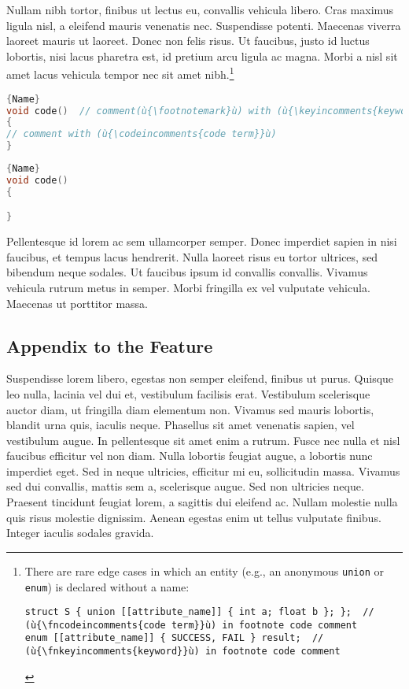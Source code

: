 Nullam nibh tortor, finibus ut lectus eu, convallis vehicula libero. Cras maximus ligula nisl, a eleifend mauris venenatis nec. Suspendisse potenti. Maecenas viverra laoreet mauris ut laoreet. Donec non felis risus. Ut faucibus, justo id luctus lobortis, nisi lacus pharetra est, id pretium arcu ligula ac magna. Morbi a nisl sit amet lacus vehicula tempor nec sit amet nibh.{\cprotect\footnote{There are rare edge cases in which an
entity (e.g., an anonymous \texttt{union} or \texttt{enum}) is
declared without a name:
\begin{lstlisting}[style=footcode,]
struct S { union [[attribute_name]] { int a; float b }; };  // (ù{\fncodeincomments{code term}}ù) in footnote code comment
enum [[attribute_name]] { SUCCESS, FAIL } result;  //  (ù{\fnkeyincomments{keyword}}ù) in footnote code comment
\end{lstlisting} \vspace*{-1ex}
      }}


\noindent\begin{minipage}{.45\textwidth}
\begin{lstlisting}[language=C++, caption=code 1 with a long and wrapping title,frame=tb]{Name}
void code()  // comment(ù{\footnotemark}ù) with (ù{\keyincomments{keyword}}ù)
{
// comment with (ù{\codeincomments{code term}}ù)
}
\end{lstlisting}
\end{minipage}\hfill
\begin{minipage}{.45\textwidth}
\begin{lstlisting}[language=C++, caption=code 2 with a long and wrapping title,frame=tb]{Name}
void code()
{

}
\end{lstlisting}
\end{minipage}

Pellentesque id lorem ac sem ullamcorper semper. Donec imperdiet sapien in nisi faucibus, et tempus lacus hendrerit. Nulla laoreet risus eu tortor ultrices, sed bibendum neque sodales. Ut faucibus ipsum id convallis convallis. Vivamus vehicula rutrum metus in semper. Morbi fringilla ex vel vulputate vehicula. Maecenas ut porttitor massa.

\subsection[Appendix to the Feature]{Appendix to the Feature}
Suspendisse lorem libero, egestas non semper eleifend, finibus ut purus. Quisque leo nulla, lacinia vel dui et, vestibulum facilisis erat. Vestibulum scelerisque auctor diam, ut fringilla diam elementum non. Vivamus sed mauris lobortis, blandit urna quis, iaculis neque. Phasellus sit amet venenatis sapien, vel vestibulum augue. In pellentesque sit amet enim a rutrum. Fusce nec nulla et nisl faucibus efficitur vel non diam. Nulla lobortis feugiat augue, a lobortis nunc imperdiet eget. Sed in neque ultricies, efficitur mi eu, sollicitudin massa. Vivamus sed dui convallis, mattis sem a, scelerisque augue. Sed non ultricies neque. Praesent tincidunt feugiat lorem, a sagittis dui eleifend ac. Nullam molestie nulla quis risus molestie dignissim. Aenean egestas enim ut tellus vulputate finibus. Integer iaculis sodales gravida.


